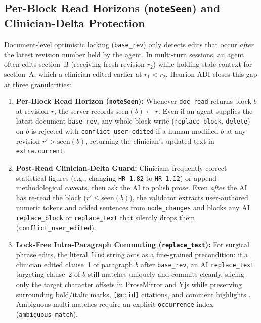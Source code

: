 \documentclass[11pt,a4paper]{article}
\begin{document}
\subsection{Per-Block Read Horizons (\texttt{noteSeen}) and Clinician-Delta Protection}
Document-level optimistic locking (\texttt{base\_rev}) only detects edits that occur \emph{after} the latest revision number held by the agent. In multi-turn sessions, an agent often edits section~B (receiving fresh revision $r_2$) while holding stale context for section~A, which a clinician edited earlier at $r_1 < r_2$. Heurion ADI closes this gap at three granularities:
\begin{enumerate}[leftmargin=1.5em,itemsep=2pt]
  \item \textbf{Per-Block Read Horizon (\texttt{noteSeen}):} Whenever \texttt{doc\_read} returns block $b$ at revision $r$, the server records $\text{seen}(b) \leftarrow r$. Even if an agent supplies the latest document \texttt{base\_rev}, any whole-block write (\texttt{replace\_block}, \texttt{delete}) on $b$ is rejected with \texttt{conflict\_user\_edited} if a human modified $b$ at any revision $r' > \text{seen}(b)$, returning the clinician's updated text in \texttt{extra.current}.
  \item \textbf{Post-Read Clinician-Delta Guard:} Clinicians frequently correct statistical figures (e.g., changing \texttt{HR 1.82} to \texttt{HR 1.12}) or append methodological caveats, then ask the AI to polish prose. Even \emph{after} the AI has re-read the block ($r' \le \text{seen}(b)$), the validator extracts user-authored numeric tokens and added sentences from \texttt{node\_changes} and blocks any AI \texttt{replace\_block} or \texttt{replace\_text} that silently drops them (\texttt{conflict\_user\_edited}).
  \item \textbf{Lock-Free Intra-Paragraph Commuting (\texttt{replace\_text}):} For surgical phrase edits, the literal \texttt{find} string acts as a fine-grained precondition: if a clinician edited clause~1 of paragraph $b$ after \texttt{base\_rev}, an AI \texttt{replace\_text} targeting clause~2 of $b$ still matches uniquely and commits cleanly, slicing only the target character offsets in ProseMirror and Yjs while preserving surrounding bold/italic marks, \texttt{[@c:id]} citations, and comment highlights \cite{litt2022peritext}. Ambiguous multi-matches require an explicit \texttt{occurrence} index (\texttt{ambiguous\_match}).
\end{enumerate}
\end{document}
